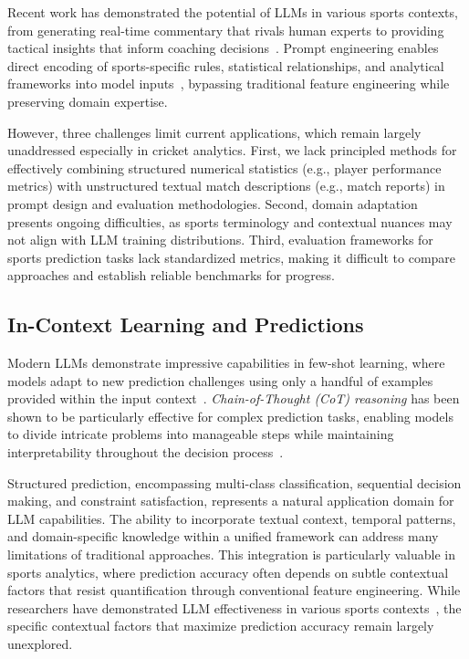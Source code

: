 \documentclass[sigconf,anonymous,review]{acmart}
\begin{document}
Recent work has demonstrated the potential of LLMs in various sports contexts, from generating real-time commentary that rivals human experts to providing tactical insights that inform coaching decisions~\cite{llm_sports_prediction}. 
Prompt engineering enables direct encoding of sports-specific rules, statistical relationships, and analytical frameworks into model inputs~\cite{prompt_engineering_survey}, bypassing traditional feature engineering while preserving domain expertise.

However, three challenges limit current applications, which remain largely unaddressed especially in cricket analytics.
First, we lack principled methods for effectively combining structured numerical statistics (e.g., player performance metrics) with unstructured textual match descriptions (e.g., match reports) in prompt design and evaluation methodologies.
Second, domain adaptation presents ongoing difficulties, as sports terminology and contextual nuances may not align with LLM training distributions.
Third, evaluation frameworks for sports prediction tasks lack standardized metrics, making it difficult to compare approaches and establish reliable benchmarks for progress.

\subsection{In-Context Learning and Predictions}

Modern LLMs demonstrate impressive capabilities in few-shot learning, where models adapt to new prediction challenges using only a handful of examples provided within the input context~\cite{few_shot_learning,gpt4_evaluation}. \emph{Chain-of-Thought (CoT) reasoning} has been shown to be particularly effective for complex prediction tasks, enabling models to divide intricate problems into manageable steps while maintaining interpretability throughout the decision process~\cite{chain_of_thought}.

Structured prediction, encompassing multi-class classification, sequential decision making, and constraint satisfaction, represents a natural application domain for LLM capabilities. The ability to incorporate textual context, temporal patterns, and domain-specific knowledge within a unified framework can address many limitations of traditional approaches. This integration is particularly valuable in sports analytics, where prediction accuracy often depends on subtle contextual factors that resist quantification through conventional feature engineering. While researchers have demonstrated LLM effectiveness in various sports contexts~\cite{cricket_win_prediction}, the specific contextual factors that maximize prediction accuracy remain largely unexplored.
\end{document}
